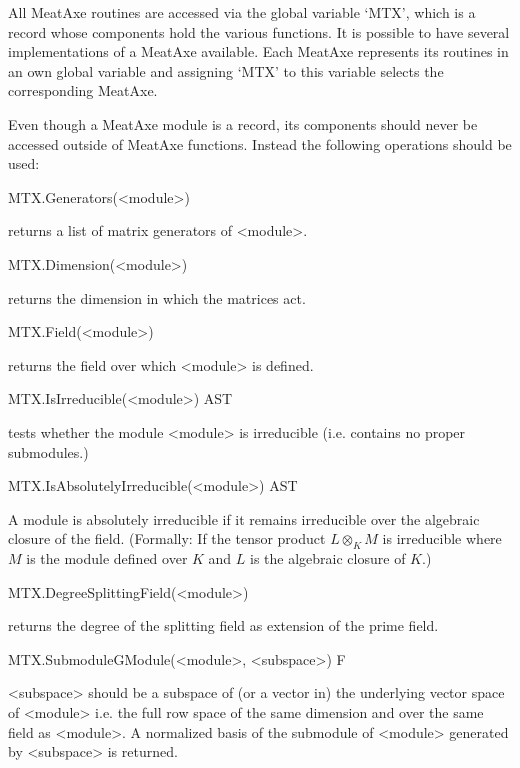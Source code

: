 All MeatAxe routines are accessed via the global variable `MTX', which is a
record whose components hold the various functions. It is possible to have
several implementations of a MeatAxe available. Each MeatAxe represents its
routines in an own global variable and assigning `MTX' to this variable
selects the corresponding MeatAxe.


Even though a MeatAxe module is a record, its components should never be
accessed outside of MeatAxe functions. Instead the following operations
should be used:

\>MTX.Generators(<module>)

returns a list of matrix generators of <module>.

\>MTX.Dimension(<module>)

returns the dimension in which the matrices act.

\>MTX.Field(<module>)

returns the field over which <module> is defined.


\>MTX.IsIrreducible(<module>) AST

tests whether the module <module> is irreducible (i.e. contains no proper
submodules.)

\>MTX.IsAbsolutelyIrreducible(<module>) AST

A module is absolutely irreducible if it remains irreducible over the
algebraic closure of the field. (Formally: If the tensor product $L\otimes_K
M$ is irreducible where $M$ is the module defined over $K$ and $L$ is the
algebraic closure of $K$.)

\>MTX.DegreeSplittingField(<module>)

returns the degree of the splitting field as extension of the prime field.


\>MTX.SubmoduleGModule(<module>, <subspace>) F

<subspace> should be a subspace of (or a vector in) the underlying vector
space of <module> i.e. the full row space of the same dimension and over
the same field as <module>. A normalized basis of the submodule of
<module> generated by <subspace> is returned.

